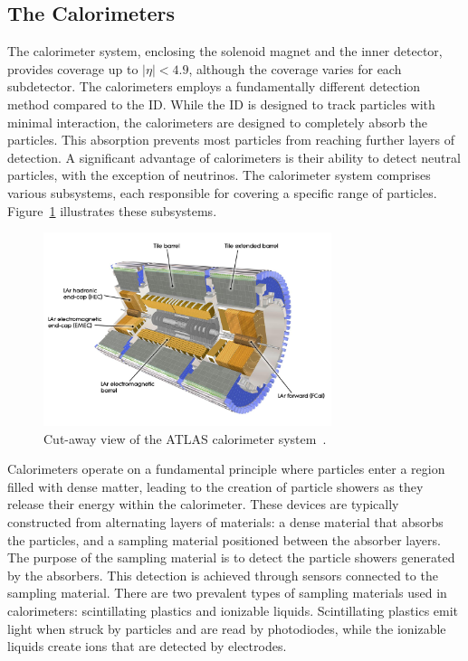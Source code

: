 \subsection{The Calorimeters}
The calorimeter system, enclosing the solenoid magnet and the inner detector, provides coverage up to \(|\eta| < 4.9\), although the coverage varies for each subdetector.
The calorimeters employs a fundamentally different detection method compared to the ID. While the ID is designed to track particles with minimal interaction, the calorimeters are designed to completely absorb the particles. This absorption prevents most particles from reaching further layers of detection. A significant advantage of calorimeters is their ability to detect neutral particles, with the exception of neutrinos. The calorimeter system comprises various subsystems, each responsible for covering a specific range of particles. Figure~\ref{fig:cal_layout} illustrates these subsystems.

\begin{figure}[ht]
    \centering
    \includegraphics[width=0.75\textwidth]{figures/LHC/cal_layout.jpg}
    \caption[]{Cut-away view of the ATLAS calorimeter system~\cite{Pequenao:1095927}.}
    \label{fig:cal_layout}
\end{figure}

Calorimeters operate on a fundamental principle where particles enter a region filled with dense matter, leading to the creation of particle showers as they release their energy within the calorimeter. These devices are typically constructed from alternating layers of materials: a dense material that absorbs the particles, and a sampling material positioned between the absorber layers. The purpose of the sampling material is to detect the particle showers generated by the absorbers.
This detection is achieved through sensors connected to the sampling material. There are two prevalent types of sampling materials used in calorimeters: scintillating plastics and ionizable liquids. Scintillating plastics emit light when struck by particles and are read by photodiodes, while the ionizable liquids create ions that are detected by electrodes.

